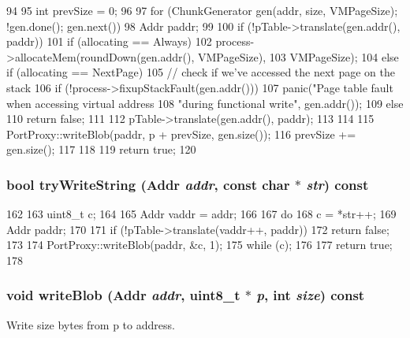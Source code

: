\begin{DoxyCode}
94 {
95     int prevSize = 0;
96 
97     for (ChunkGenerator gen(addr, size, VMPageSize); !gen.done(); gen.next()) {
98         Addr paddr;
99 
100         if (!pTable->translate(gen.addr(), paddr)) {
101             if (allocating == Always) {
102                 process->allocateMem(roundDown(gen.addr(), VMPageSize),
103                                      VMPageSize);
104             } else if (allocating == NextPage) {
105                 // check if we've accessed the next page on the stack
106                 if (!process->fixupStackFault(gen.addr()))
107                     panic("Page table fault when accessing virtual address %
108                             "during functional write\n", gen.addr());
109             } else {
110                 return false;
111             }
112             pTable->translate(gen.addr(), paddr);
113         }
114 
115         PortProxy::writeBlob(paddr, p + prevSize, gen.size());
116         prevSize += gen.size();
117     }
118 
119     return true;
120 }
\end{DoxyCode}
\hypertarget{classSETranslatingPortProxy_a7388a80b5c85481ecf18bac69ea2fc34}{
\subsubsection[{tryWriteString}]{\setlength{\rightskip}{0pt plus 5cm}bool tryWriteString ({\bf Addr} {\em addr}, \/  const char $\ast$ {\em str}) const}}
\label{classSETranslatingPortProxy_a7388a80b5c85481ecf18bac69ea2fc34}



\begin{DoxyCode}
162 {
163     uint8_t c;
164 
165     Addr vaddr = addr;
166 
167     do {
168         c = *str++;
169         Addr paddr;
170 
171         if (!pTable->translate(vaddr++, paddr))
172             return false;
173 
174         PortProxy::writeBlob(paddr, &c, 1);
175     } while (c);
176 
177     return true;
178 }
\end{DoxyCode}
\hypertarget{classSETranslatingPortProxy_ad2a72c978fca534c6afc8b0f6ac2fe19}{
\subsubsection[{writeBlob}]{\setlength{\rightskip}{0pt plus 5cm}void writeBlob ({\bf Addr} {\em addr}, \/  uint8\_\-t $\ast$ {\em p}, \/  int {\em size}) const}}
\label{classSETranslatingPortProxy_ad2a72c978fca534c6afc8b0f6ac2fe19}
Write size bytes from p to address. 

